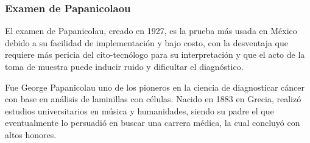 \begin{table}[H]
    \centering
    \caption{Técnicas principales de diagnóstico de CCU}\label{tabla:tecnicas}
    \end{table}

\subsubsection{Examen de Papanicolaou}

El examen de Papanicolau, creado en 1927, es la
prueba más usada en México debido a su facilidad de implementación y bajo costo,
con la desventaja que requiere más pericia del cito-tecnólogo para su
interpretación y que el acto de la toma de muestra puede inducir ruido y
dificultar el diagnóstico. 

Fue George Papanicolau uno de los pioneros en la ciencia de diagnosticar cáncer
con base en análisis de laminillas con células. Nacido en 1883 en Grecia, realizó
estudios universitarios en música y humanidades, siendo su padre el que eventualmente
lo persuadió en buscar una carrera médica, la cual concluyó con altos honores.

